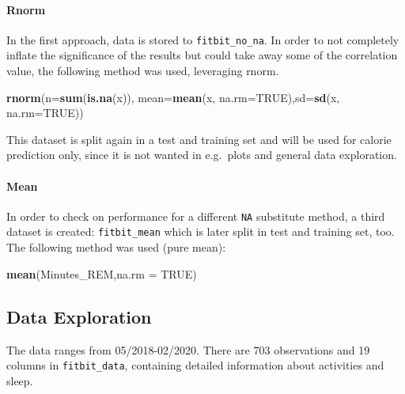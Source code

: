 \documentclass[
]{article}
\newenvironment{Shaded}{\begin{snugshade}}{\end{snugshade}}
\newcommand{\DataTypeTok}[1]{\textcolor[rgb]{0.13,0.29,0.53}{#1}}
\newcommand{\KeywordTok}[1]{\textcolor[rgb]{0.13,0.29,0.53}{\textbf{#1}}}
\newcommand{\NormalTok}[1]{#1}
\newcommand{\OtherTok}[1]{\textcolor[rgb]{0.56,0.35,0.01}{#1}}
\begin{document}
\hypertarget{rnorm}{%
\paragraph{Rnorm}\label{rnorm}}

In the first approach, data is stored to \texttt{fitbit\_no\_na}. In
order to not completely inflate the significance of the results but
could take away some of the correlation value, the following method was
used, leveraging rnorm.

\begin{Shaded}
\begin{Highlighting}[]
\KeywordTok{rnorm}\NormalTok{(}\DataTypeTok{n=}\KeywordTok{sum}\NormalTok{(}\KeywordTok{is.na}\NormalTok{(x)), }\DataTypeTok{mean=}\KeywordTok{mean}\NormalTok{(x, }\DataTypeTok{na.rm=}\OtherTok{TRUE}\NormalTok{),}\DataTypeTok{sd=}\KeywordTok{sd}\NormalTok{(x, }\DataTypeTok{na.rm=}\OtherTok{TRUE}\NormalTok{))}
\end{Highlighting}
\end{Shaded}

This dataset is split again in a test and training set and will be used
for calorie prediction only, since it is not wanted in e.g.~plots and
general data exploration.

\hypertarget{mean}{%
\paragraph{Mean}\label{mean}}

In order to check on performance for a different \texttt{NA} substitute
method, a third dataset is created: \texttt{fitbit\_mean} which is later
split in test and training set, too. The following method was used (pure
mean):

\begin{Shaded}
\begin{Highlighting}[]
\KeywordTok{mean}\NormalTok{(Minutes_REM,}\DataTypeTok{na.rm =} \OtherTok{TRUE}\NormalTok{)}
\end{Highlighting}
\end{Shaded}

\hypertarget{data-exploration}{%
\subsection{Data Exploration}\label{data-exploration}}

The data ranges from 05/2018-02/2020. There are 703 observations and 19
columns in \texttt{fitbit\_data}, containing detailed information about
activities and sleep.
\end{document}
